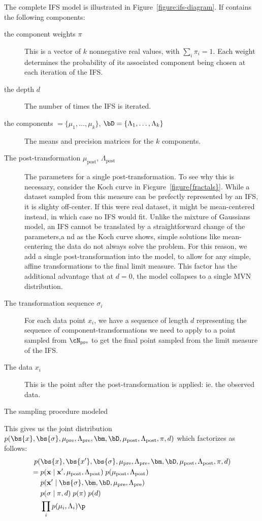 The complete IFS model is illustrated in Figure~\ref{figure:ifs-diagram}. If contains the following components:
\begin{description}
\item[the component weights $\pi$] This is a vector of $k$ nonnegative real values, with $\sum_i \pi_i = 1$. Each weight determines the probability of its associated component being chosen at each iteration of the IFS.
\item[the depth $d$] The number of times the IFS is iterated.
\item[the components $\bm = \{\mu_1, \ldots, \mu_k\}$, $\bD = \{\Lambda_1, \ldots, \Lambda_k\}$] The means and precision matrices for the $k$ components. 
\item[The post-transformation $\mu_\text{post}$, $\Lambda_\text{post}$] The parameters for a single post-transformation. To see why this is necessary, consider the Koch curve in Ficgure~\ref{figure{fractals}}. While a dataset sampled from this measure can be prefectly represented by an IFS, it is slighty off-center. If this were real dataset, it might be mean-centered instead, in which case no IFS would fit. Unlike the mixture of Gaussians model, an IFS cannot be translated by a straightforward change of the parameters,a nd as the Koch curve shows, simple solutions like mean-centering the data do not always solve the problem. For this reason, we add a single post-transformation into the model, to allow for any simple, affine transformations to the final limit measure. This factor has the additional advantage that at $d = 0$, the model collapses to a single MVN distribution.
\item[The transformation sequence $\sigma_i$] For each data point $x_i$, we have a sequence of length $d$ representing the sequence of component-transformations we need to apply to a point sampled from $\cN_\text{pre}$ to get the final point sampled from the limit measure of the IFS. 
\item[The data $x_i$] This is the point after the post-transformation is applied: ie. the observed data.
\end{description}

The sampling procedure modeled 

This gives us the joint distribution $p(\bs{x}, \bs{\sigma}, \mu_\text{pre}, \Lambda_\text{pre}, \bm, \bD, \mu_\text{post}, \Lambda_\text{post}, \pi, d)$ which factorizes as follows:
\begin{align}
p(&\bs{x}, \bs{x'}, \bs{\sigma}, \mu_\text{pre}, \Lambda_\text{pre}, \bm, \bD, \mu_\text{post}, \Lambda_\text{post}, \pi, d) \notag\\ 
=\;& p(\mathbf{x} \mid \mathbf{x'}, \mu_\text{post}, \Lambda_\text{post}) \; p(\mu_\text{post}, \Lambda_\text{post}) \notag\\
& p(\mathbf{x'} \mid \bs{\sigma}, \bm, \bD, \mu_\text{pre}, \Lambda_\text{pre}) \notag\\
& p(\mathbf{\sigma} \mid \pi, d) \; p(\pi) \; p(d) \notag\\
& \prod_i p(\mu_i, \Lambda_i) \p \label{line:factorization}\\
\end{align}

